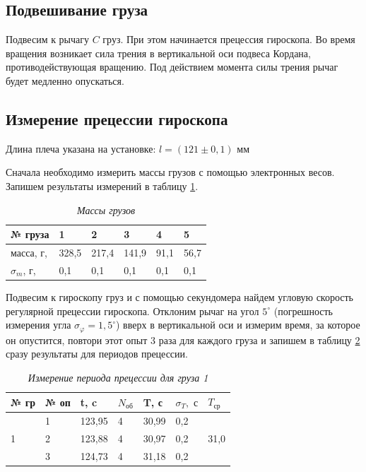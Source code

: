 \documentclass[a4paper,12pt]{article}
\begin{document}
\subsection{Подвешивание груза}

Подвесим к рычагу $C$ груз. При этом начинается прецессия гироскопа. Во время вращения возникает сила трения в вертикальной оси подвеса Кордана, противодействующая вращению. Под действием момента силы трения рычаг будет медленно опускаться.

\subsection{Измерение прецессии гироскопа}
\label{4-5}


Длина плеча указана на установке: $l = (121 \pm 0,1) \text{ мм}$

Сначала необходимо измерить массы грузов с помощью электронных весов. Запишем результаты измерений в таблицу \ref{mass}.

\begin{table}[!ht]
    \centering
    \begin{tabular}{|l|l|l|l|l|l|}
    \hline
        № груза & 1 & 2 & 3 & 4 & 5 \\ \hline
        масса, г, & 328,5 & 217,4 & 141,9 & 91,1 & 56,7 \\ \hline
        $\sigma_m$, г, & 0,1 & 0,1 & 0,1 & 0,1 & 0,1 \\ \hline
    \end{tabular}\caption{\textit{Массы грузов}}\label{mass}
\end{table}

Подвесим к гироскопу груз и с помощью секундомера найдем угловую скорость регулярной прецессии гироскопа. Отклоним рычаг на угол $5^\circ$ (погрешность измерения угла $\sigma_\varphi = 1,5^\circ$) вверх в вертикальной оси и измерим время, за которое он опустится, повтори этот опыт 3 раза для каждого груза и запишем в таблицу \ref{precession-1} сразу результаты для периодов прецессии.

\begin{table}[!ht]
    \centering
    \begin{tabular}{|l|l|l|l|l|l|l|}
    \hline
        № гр & № оп & t, c & $N_\text{об}$ & T, с & $\sigma_T, \text{ с}$ & $T_\text{ср}$ \\ \hline
        \multirow{3}{*}{1} & 1 & 123,95 & 4 & 30,99 & 0,2 & \multirow{3}{*}{31,0} \\ \cline{2-6}
        ~ & 2 & 123,88 & 4 & 30,97 & 0,2 & ~ \\ \cline{2-6}
        ~ & 3 & 124,73 & 4 & 31,18 & 0,2 & ~ \\ \hline
    \end{tabular}\caption{\textit{Измерение периода прецессии для груза 1}}\label{precession-1}
\end{table}
\end{document}
